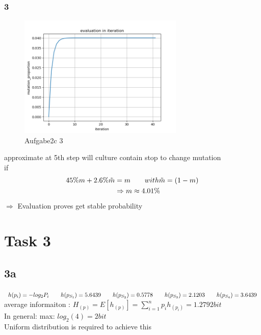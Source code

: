 \documentclass{article}
\begin{document}
\subsubsection*{3}
\begin{figure}[H] 
\centering 
\includegraphics[width=0.7\textwidth]{Aufgabe_2c_3.png} 
\caption{Aufgabe2c 3} 
\label{Fig.main3}
\end{figure}
approximate at 5th step will culture contain stop to change mutation\\[20pt]
if 
\begin{equation}\notag
\begin{aligned}
45\%m+2.6\% \tilde{m}&=m \qquad with \tilde{m} = (1-m)\\
&\Rightarrow m \approx 4.01\% \\
\end{aligned}
\end{equation}
$\Rightarrow$
Evaluation proves get stable probability
\newpage
\section*{Task 3}
\subsection*{3a}
$
h(p_i) = -log_2 P_i \\[15pt]
 \qquad h(p_{S_1}) = 5.6439 \qquad h(p_{S_2}) = 0.5778  \qquad h(p_{S_3}) = 2.1203  \qquad h(p_{S_4}) = 3.6439  
$
\\[15pt]
average informaiton : 
$
H_{(p)}=E[h_{(p)}]= \sum\limits_{i=1}^{n}p_i h_{(p_i)}=1.2792 bit
$
\\[15pt]
In general: max: $log_2(4)=2bit$\\[15pt]
Uniform distribution is required to achieve this\\[15pt]
\end{document}
